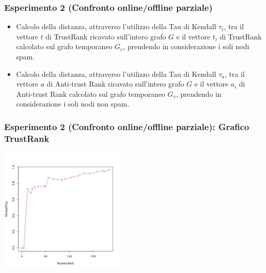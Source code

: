 \documentclass{beamer}
\begin{document}
\begin{frame}
\frametitle{Esperimento 2 {\tiny(Confronto online/offline parziale)}}
  \begin{itemize}
   \item<1-> Calcolo della distanza, attraverso l’utilizzo della Tau di Kendall \(\tau_t\), tra il vettore \(t\) di TrustRank ricavato sull’intero grafo \(G\) e il vettore \(t_i\) di TrustRank calcolato sul grafo temporaneo \(G_v\), prendendo in considerazione i soli nodi spam.
   \item<2-> Calcolo della distanza, attraverso l’utilizzo della Tau di Kendall \(\tau_a\), tra il vettore \(a\) di Anti-trust Rank ricavato sull’intero grafo \(G\) e il vettore \(a_i\) di Anti-trust Rank calcolato sul grafo temporaneo \(G_v\), prendendo in considerazione i soli nodi non spam.
  \end{itemize}
  \end{frame}
  \begin{frame}
\frametitle{Esperimento 2 {\tiny(Confronto online/offline parziale)}: Grafico TrustRank}
\begin{center}
 \includegraphics[height=6cm]{immagini/test2/trustrankBadNodesTestMode1_62}
\end{center}
\end{frame}
\end{document}
